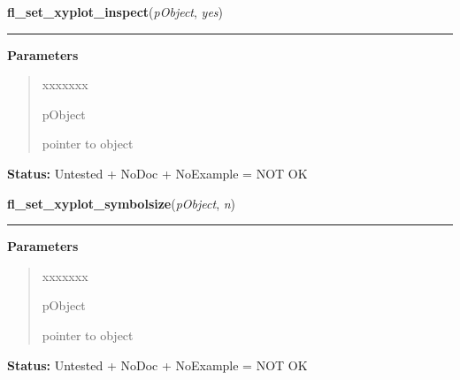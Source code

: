 \hspace{.8\funcindent}\begin{boxedminipage}{\funcwidth}

    \raggedright \textbf{fl\_set\_xyplot\_inspect}(\textit{pObject}, \textit{yes})

    \vspace{-1.5ex}

    \rule{\textwidth}{0.5\fboxrule}
\setlength{\parskip}{2ex}
\setlength{\parskip}{1ex}
      \textbf{Parameters}
      \vspace{-1ex}

      \begin{quote}
        \begin{Ventry}{xxxxxxx}

          \item[pObject]

          pointer to object

        \end{Ventry}

      \end{quote}

\textbf{Status:} Untested + NoDoc + NoExample = NOT OK



    \end{boxedminipage}

    \label{xformslib:library:fl_set_xyplot_symbolsize}

    \vspace{0.5ex}

\hspace{.8\funcindent}\begin{boxedminipage}{\funcwidth}

    \raggedright \textbf{fl\_set\_xyplot\_symbolsize}(\textit{pObject}, \textit{n})

    \vspace{-1.5ex}

    \rule{\textwidth}{0.5\fboxrule}
\setlength{\parskip}{2ex}
\setlength{\parskip}{1ex}
      \textbf{Parameters}
      \vspace{-1ex}

      \begin{quote}
        \begin{Ventry}{xxxxxxx}

          \item[pObject]

          pointer to object

        \end{Ventry}

      \end{quote}

\textbf{Status:} Untested + NoDoc + NoExample = NOT OK



    \end{boxedminipage}

